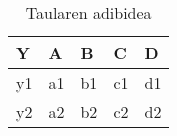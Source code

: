 \begin{table}[t]
	\centering
	\begin{tabular}{l|llll}
		Y & A & B & C & D\\
		\hline
		y1 & a1 & b1 & c1 & d1\\
		y2 & a2 & b2 & c2 & d2\\
	\end{tabular}
	\caption {Taularen adibidea}\label{tab:adibidea}
\end{table}